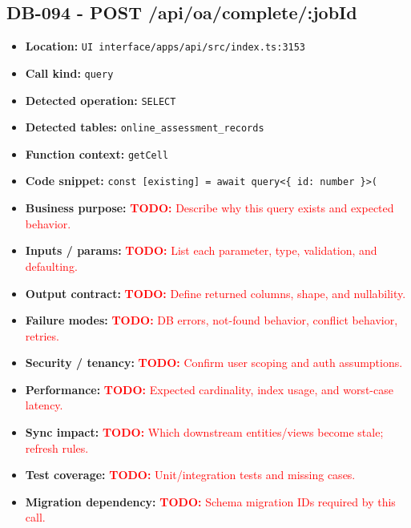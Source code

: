 \documentclass[11pt]{article}
\newcommand{\todoitem}[1]{\textcolor{red}{\textbf{TODO:} #1}}
\begin{document}
\subsection{DB-094 - POST /api/oa/complete/:jobId}
\begin{itemize}[leftmargin=1.5em]
\item \textbf{Location:} \texttt{UI interface/apps/api/src/index.ts:3153}
\item \textbf{Call kind:} \texttt{query}
\item \textbf{Detected operation:} \texttt{SELECT}
\item \textbf{Detected tables:} \texttt{online\_assessment\_records}
\item \textbf{Function context:} \texttt{getCell}
\item \textbf{Code snippet:} \texttt{const [existing] = await query<\{ id: number \}>(}
\item \textbf{Business purpose:} \todoitem{Describe why this query exists and expected behavior.}
\item \textbf{Inputs / params:} \todoitem{List each parameter, type, validation, and defaulting.}
\item \textbf{Output contract:} \todoitem{Define returned columns, shape, and nullability.}
\item \textbf{Failure modes:} \todoitem{DB errors, not-found behavior, conflict behavior, retries.}
\item \textbf{Security / tenancy:} \todoitem{Confirm user scoping and auth assumptions.}
\item \textbf{Performance:} \todoitem{Expected cardinality, index usage, and worst-case latency.}
\item \textbf{Sync impact:} \todoitem{Which downstream entities/views become stale; refresh rules.}
\item \textbf{Test coverage:} \todoitem{Unit/integration tests and missing cases.}
\item \textbf{Migration dependency:} \todoitem{Schema migration IDs required by this call.}
\end{itemize}
\end{document}
